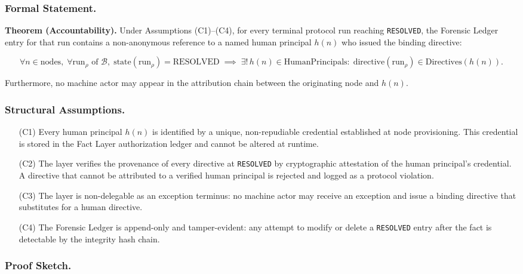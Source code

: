 \subsubsection{Formal Statement.}

\begin{bluebox}
\textbf{Theorem (Accountability).} Under Assumptions (C1)--(C4), for every terminal protocol run reaching \texttt{RESOLVED}, the Forensic Ledger entry for that run contains a non-anonymous reference to a named human principal $h(n)$ who issued the binding directive:

\[
\forall n \in \text{nodes},\; \forall \text{run}_\rho \text{ of } \mathcal{B},\; 
\text{state}(\text{run}_\rho) = \text{RESOLVED} \;\implies\; 
\exists!\, h(n) \in \text{HumanPrincipals}:\; \text{directive}(\text{run}_\rho) \in \text{Directives}(h(n)).
\tag{ACCOUNTABILITY}
\]

Furthermore, no machine actor may appear in the attribution chain between the originating node and $h(n)$.
\end{bluebox}

\subsubsection{Structural Assumptions.}

\begin{enumerate}
\item[(C1)] Every human principal $h(n)$ is identified by a unique, non-repudiable credential established at node provisioning. This credential is stored in the Fact Layer authorization ledger and cannot be altered at runtime.
\item[(C2)] The \fact{} layer verifies the provenance of every directive at \texttt{RESOLVED} by cryptographic attestation of the human principal's credential. A directive that cannot be attributed to a verified human principal is rejected and logged as a protocol violation.
\item[(C3)] The \purpose{} layer is non-delegable as an exception terminus: no machine actor may receive an exception and issue a binding directive that substitutes for a human directive.
\item[(C4)] The Forensic Ledger is append-only and tamper-evident: any attempt to modify or delete a \texttt{RESOLVED} entry after the fact is detectable by the integrity hash chain.
\end{enumerate}

\subsubsection{Proof Sketch.}


